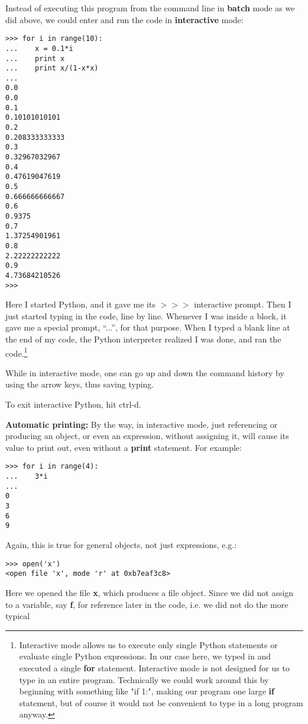 Instead of executing this program from the command line in {\bf batch}
mode as we did above, we could enter and run the code in {\bf
interactive} mode:

\begin{Verbatim}[fontsize=\relsize{-2}]
% python
>>> for i in range(10):
...    x = 0.1*i
...    print x
...    print x/(1-x*x)
... 
0.0
0.0
0.1
0.10101010101
0.2
0.208333333333
0.3
0.32967032967
0.4
0.47619047619
0.5
0.666666666667
0.6
0.9375
0.7
1.37254901961
0.8
2.22222222222
0.9
4.73684210526
>>> 
\end{Verbatim}

Here I started Python, and it gave me its $>>>$ interactive prompt.
Then I just started typing in the code, line by line.  Whenever I was
inside a block, it gave me a special prompt, ``...'', for that purpose.
When I typed a blank line at the end of my code, the Python interpreter
realized I was done, and ran the code.\footnote{Interactive mode allows
us to execute only single Python statements or evaluate single Python
expressions.  In our case here, we typed in and executed a single {\bf
for} statement.  Interactive mode is not designed for us to type in an
entire program.  Technically we could work around this by beginning with
something like "if 1:", making our program one large {\bf if} statement,
but of course it would not be convenient to type in a long program
anyway.}

While in interactive mode, one can go up and down the command history by
using the arrow keys, thus saving typing.

To exit interactive Python, hit ctrl-d.

{\bf Automatic printing:} By the way, in interactive mode, just
referencing or producing an object, or even an expression, without
assigning it, will cause its value to print out, even without a {\bf
print} statement.  For example:

\begin{Verbatim}[fontsize=\relsize{-2}]
>>> for i in range(4):
...    3*i
...
0
3
6
9
\end{Verbatim}

Again, this is true for general objects, not just expressions, e.g.:

\begin{Verbatim}[fontsize=\relsize{-2}]
>>> open('x')
<open file 'x', mode 'r' at 0xb7eaf3c8>
\end{Verbatim}

Here we opened the file {\bf x}, which produces a file object.  Since we
did not assign to a variable, say {\bf f}, for reference later in the
code, i.e. we did not do the more typical

